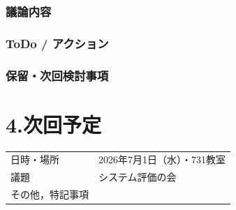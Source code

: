 \documentclass[a4paper,12pt]{ltjsarticle}
\begin{document}
\subsubsection*{議論内容}

\subsubsection*{ToDo / アクション}

\subsubsection*{保留・次回検討事項}

\section*{4.次回予定}
\begin{tabular}{ll}
  \toprule
  日時・場所 & 2026年7月1日（水）・731教室 \\
  議題       & システム評価の会\\
  その他，特記事項 & \\
  \bottomrule
\end{tabular}
\end{document}
